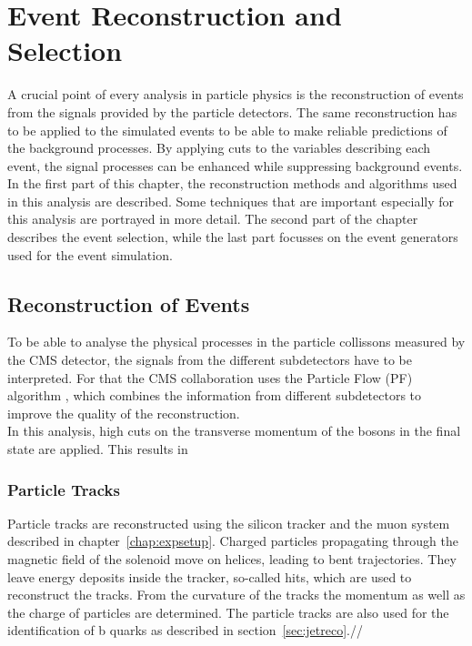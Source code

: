 \chapter{Event Reconstruction and Selection}
\label{chap::EventReconstructionandSelection}
A crucial point of every analysis in particle physics is the reconstruction of events from the signals provided by the particle detectors. The same reconstruction has to be applied to the simulated events to be able to make reliable predictions of the background processes. By applying cuts to the variables describing each event, the signal processes can be enhanced while suppressing background events.\\

\noindent In the first part of this chapter, the reconstruction methods and algorithms used in this analysis are described. Some techniques that are important especially for this analysis are portrayed in more detail. The second part of the chapter describes the event selection, while the last part focusses on the event generators used for the event simulation.
\section{Reconstruction of Events}
To be able to analyse the physical processes in the particle collissons measured by the CMS detector, the signals from the different subdetectors have to be interpreted. For that the CMS collaboration uses the Particle Flow (PF) algorithm \cite{PF1,PF2}, which combines the information from different subdetectors to improve the quality of the reconstruction.\\

\noindent In this analysis, high cuts on the transverse momentum of the bosons in the final state are applied. This results in
\subsection{Particle Tracks}
Particle tracks are reconstructed using the silicon tracker and the muon system described in chapter~\ref{chap:expsetup}. Charged particles propagating through the magnetic field of the solenoid move on helices, leading to bent trajectories. They leave energy deposits inside the tracker, so-called hits, which are used to reconstruct the tracks. From the curvature of the tracks the momentum as well as the charge of particles are determined. The particle tracks are also used for the identification of b quarks as described in section~\ref{sec:jetreco}.//


